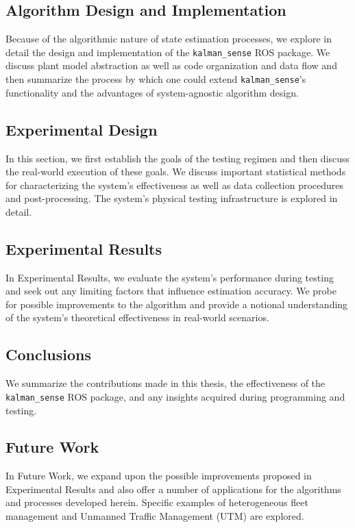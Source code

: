 \subsection*{Algorithm Design and Implementation}

Because of the algorithmic nature of state estimation processes, we explore in detail the design and implementation of the \texttt{kalman\_sense} ROS package. We discuss plant model abstraction as well as code organization and data flow and then summarize the process by which one could extend \texttt{kalman\_sense}'s functionality and the advantages of system-agnostic algorithm design.

\subsection*{Experimental Design}

In this section, we first establish the goals of the testing regimen and then discuss the real-world execution of these goals. We discuss important statistical methods for characterizing the system's effectiveness as well as data collection procedures and post-processing. The system's physical testing infrastructure is explored in detail.

\subsection*{Experimental Results}

In Experimental Results, we evaluate the system's performance during testing and seek out any limiting factors that influence estimation accuracy. We probe for possible improvements to the algorithm and provide a notional understanding of the system's theoretical effectiveness in real-world scenarios.

\subsection*{Conclusions}

We summarize the contributions made in this thesis, the effectiveness of the \texttt{kalman\_sense} ROS package, and any insights acquired during programming and testing. 

\subsection*{Future Work}

In Future Work, we expand upon the possible improvements proposed in Experimental Results and also offer a number of applications for the algorithms and processes developed herein. Specific examples of heterogeneous fleet management and Unmanned Traffic Management (UTM) are explored.